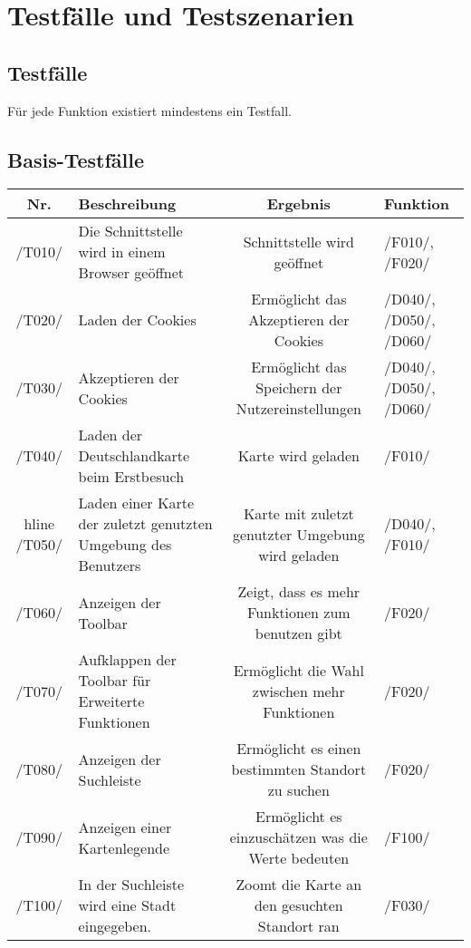 \section{Testfälle und Testszenarien}
\subsection{Testfälle}

Für jede Funktion existiert mindestens ein Testfall.
\newline
\subsection{Basis-Testfälle}
\begin{tabularx}{\textwidth}{| c | X | c | X |}
    \hline
    \textbf{Nr.} & 
    \textbf{Beschreibung} &
    \textbf{Ergebnis} &
    \textbf{Funktion}\\
    \hline
    /T010/ & Die Schnittstelle wird in einem Browser geöffnet & Schnittstelle wird geöffnet & /F010/, /F020/ \\
    \hline
    /T020/ & Laden der \glspl{Cookie} & Ermöglicht das Akzeptieren der \glspl{Cookie} & /D040/, /D050/, /D060/ \\
    \hline
    /T030/ & Akzeptieren der \glspl{Cookie} & Ermöglicht das Speichern der Nutzereinstellungen & /D040/, /D050/, /D060/ \\
    \hline
    /T040/ & Laden der Deutschlandkarte beim Erstbesuch & Karte wird geladen & /F010/ \\
     hline
    /T050/ & Laden einer Karte der zuletzt genutzten Umgebung des Benutzers & Karte mit zuletzt genutzter Umgebung wird geladen & /D040/, /F010/ \\
    \hline
    /T060/ & Anzeigen der \gls{Toolbar} & Zeigt, dass es mehr Funktionen zum benutzen gibt & /F020/ \\
    \hline
    /T070/ & Aufklappen der \gls{Toolbar} für Erweiterte Funktionen & Ermöglicht die Wahl zwischen mehr Funktionen & /F020/ \\
    \hline
    /T080/ & Anzeigen der Suchleiste & Ermöglicht es einen bestimmten Standort zu suchen & /F020/ \\
    \hline
    /T090/ & Anzeigen einer Kartenlegende & Ermöglicht es einzuschätzen was die Werte bedeuten & /F100/ \\
    \hline
    /T100/ & In der Suchleiste wird eine Stadt eingegeben. & Zoomt die Karte an den gesuchten Standort ran & /F030/ \\

\end{tabularx}
